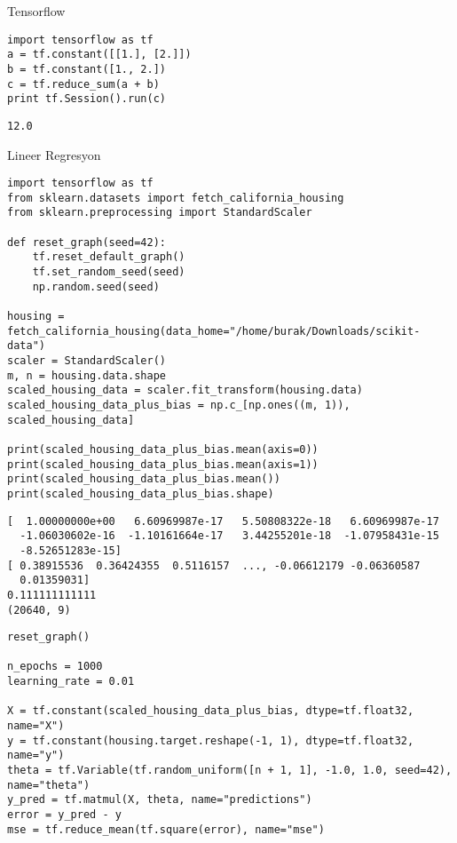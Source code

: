 \documentclass[12pt,fleqn]{article}\usepackage{../../common}
\begin{document}
Tensorflow

\begin{verbatim}
import tensorflow as tf
a = tf.constant([[1.], [2.]])
b = tf.constant([1., 2.])
c = tf.reduce_sum(a + b)
print tf.Session().run(c)
\end{verbatim}

\begin{verbatim}
12.0
\end{verbatim}

Lineer Regresyon

\begin{verbatim}
import tensorflow as tf
from sklearn.datasets import fetch_california_housing
from sklearn.preprocessing import StandardScaler

def reset_graph(seed=42):
    tf.reset_default_graph()
    tf.set_random_seed(seed)
    np.random.seed(seed)

housing = fetch_california_housing(data_home="/home/burak/Downloads/scikit-data")
scaler = StandardScaler()
m, n = housing.data.shape
scaled_housing_data = scaler.fit_transform(housing.data)
scaled_housing_data_plus_bias = np.c_[np.ones((m, 1)), scaled_housing_data]

print(scaled_housing_data_plus_bias.mean(axis=0))
print(scaled_housing_data_plus_bias.mean(axis=1))
print(scaled_housing_data_plus_bias.mean())
print(scaled_housing_data_plus_bias.shape)
\end{verbatim}

\begin{verbatim}
[  1.00000000e+00   6.60969987e-17   5.50808322e-18   6.60969987e-17
  -1.06030602e-16  -1.10161664e-17   3.44255201e-18  -1.07958431e-15
  -8.52651283e-15]
[ 0.38915536  0.36424355  0.5116157  ..., -0.06612179 -0.06360587
  0.01359031]
0.111111111111
(20640, 9)
\end{verbatim}

\begin{verbatim}
reset_graph()

n_epochs = 1000
learning_rate = 0.01

X = tf.constant(scaled_housing_data_plus_bias, dtype=tf.float32, name="X")
y = tf.constant(housing.target.reshape(-1, 1), dtype=tf.float32, name="y")
theta = tf.Variable(tf.random_uniform([n + 1, 1], -1.0, 1.0, seed=42), name="theta")
y_pred = tf.matmul(X, theta, name="predictions")
error = y_pred - y
mse = tf.reduce_mean(tf.square(error), name="mse")
\end{verbatim}
\end{document}
